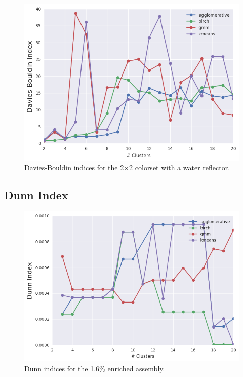 \begin{figure}[h!]
\centering
\includegraphics[width=0.87\linewidth]{figures/results/model-select/reflector/db-combined-U238-nu-fission-1}
\vspace{2mm}
\caption[Davies-Bouldin indices for the 2$\times$2 colorset with reflector]{Davies-Bouldin indices for the 2$\times$2 colorset with a water reflector.}
\label{fig:chap11-refl-db-index}
\end{figure}

\clearpage


\subsection{Dunn Index}
\label{subsec:chap11-dunn-index}

\begin{figure}[h!]
\centering
\includegraphics[width=0.87\linewidth]{figures/results/model-select/assm-16/dunn-combined-U238-capture-1}
\vspace{2mm}
\caption[Dunn indices for the 1.6\% enriched assembly]{Dunn indices for the 1.6\% enriched assembly.}
\label{fig:chap11-assm-16-dunn-index}
\end{figure}

